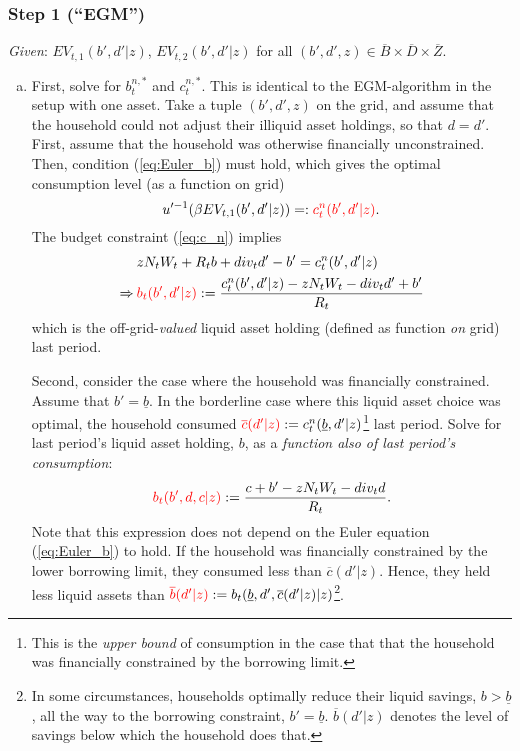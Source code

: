 \documentclass[11pt]{article} %
\begin{document}
\subsubsection{Step 1 (``EGM'')}
\textit{Given}: $EV_{t,1}(b',d'|z)$, $EV_{t,2}(b',d'|z)$ for all $(b',d',z)\in \overline{B} \times \overline{D} \times \overline{Z}$. 
\begin{enumerate}[a.)]
\item First, solve for $b_t^{n,*}$ and $c_t^{n,*}$. This is identical to the EGM-algorithm in the setup with one asset. Take a tuple $(b',d',z)$ on the grid, and assume that the household could not adjust their illiquid asset holdings, so that $d=d'$. First, assume that the household was otherwise financially unconstrained. Then, condition (\ref{eq:Euler_b}) must hold, which gives the optimal consumption level (as a function on grid)
\begin{equation}
u'^{-1}(\beta EV_{t,1}(b',d'|z)) =: \textcolor{red}{c^n_t(b',d'|z)}.\label{eq:Vb2c_n}
\end{equation}
The budget constraint (\ref{eq:c_n}) implies
\begin{align}
&z N_t W_t + R_t b + div_t d' - b' = c^n_t(b',d'|z)\\
\Rightarrow\: & \textcolor{red}{b_t(b',d'|z)} := \frac{c^n_t(b',d'|z)-z N_t W_t -div_t d' + b'}{R_t}
\end{align}
which is the off-grid-\textit{valued} liquid asset holding (defined as function \textit{on} grid) last period.

Second, consider the case where the household was financially constrained. Assume that $b' = \underline{b}$. In the borderline case where this liquid asset choice was optimal, the household consumed $\textcolor{red}{\overline{c}(d'|z)} := c^n_t(\underline{b},d'|z)$\footnote{This is the \textit{upper bound} of consumption in the case that that the household was financially constrained by the borrowing limit.} last period. Solve for last period's liquid asset holding, $b$, as a \textit{function also of last period's consumption}:
\begin{equation}
\textcolor{red}{b_t(b',d,c|z)} := \frac{c + b' - zN_tW_t-div_td}{R_t}.
\end{equation}
Note that this expression does not depend on the Euler equation (\ref{eq:Euler_b}) to hold. If the household was financially constrained by the lower borrowing limit, they consumed less than $\overline{c}(d'|z)$. Hence, they held less liquid assets than $\textcolor{red}{\overline{b}(d'|z)} := b_t(\underline{b},d',\overline{c}(d'|z)|z)$\footnote{In some circumstances, households optimally reduce their liquid savings, $b>\underline{b}$, all the way to the borrowing constraint, $b'=\underline{b}$. $\overline{b}(d'|z)$ denotes the level of savings below which the household does that.}.


\end{enumerate}
\end{document}
